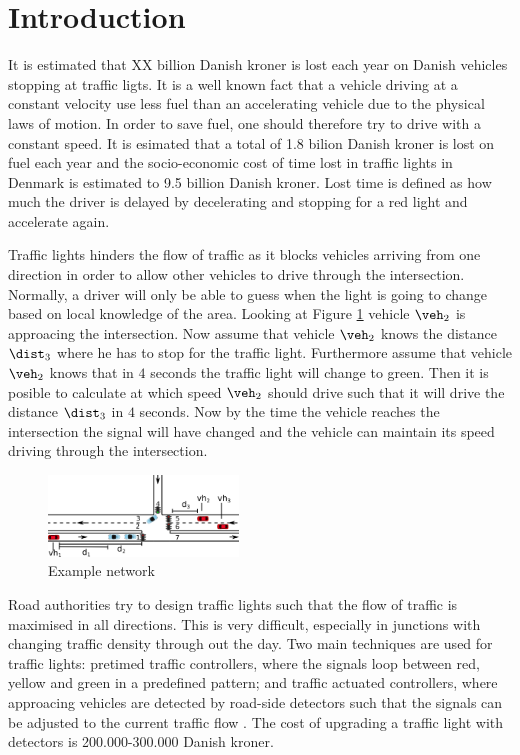 \section{Introduction}
It is estimated that XX billion Danish kroner is lost each year on Danish vehicles stopping at traffic ligts.\cite{Vejdir} %
It is a well known fact that a vehicle driving at a constant velocity use less fuel than an accelerating vehicle due to the physical laws of motion.
In order to save fuel, one should therefore try to drive with a constant speed.
It is esimated that a total of 1.8 bilion Danish kroner is lost on fuel each year and the socio-economic cost of time lost in traffic lights in Denmark is estimated to 9.5 billion Danish kroner. 
Lost time is defined as how much the driver is delayed by decelerating and stopping for a red light and accelerate again.

Traffic lights hinders the flow of traffic as it blocks vehicles arriving from one direction in order to allow other vehicles to drive through the intersection.
Normally, a driver will only be able to guess when the light is going to change based on local knowledge of the area. 
Looking at Figure \ref{fig:Introduction:network} vehicle $\veh_2$ is approacing the intersection.
Now assume that vehicle $\veh_2$ knows the distance $\dist_3$ where he has to stop for the traffic light. 
Furthermore assume that vehicle $\veh_2$ knows that in $4$ seconds the traffic light will change to green. 
Then it is posible to calculate at which speed $\veh_2$ should drive such that it will drive the distance $\dist_3$ in $4$ seconds. 
Now by the time the vehicle reaches the intersection the signal will have changed and the vehicle can maintain its speed driving through the intersection.
\begin{figure}[htb]
\centering
\includegraphics[width=0.45\textwidth]{../images/introNetwork.png}
\caption{Example network}
\label{fig:Introduction:network}
\end{figure}

Road authorities try to design traffic lights such that the flow of traffic is maximised in all directions.
This is very difficult, especially in junctions with changing traffic density through out the day.
Two main techniques are used for traffic lights: pretimed traffic controllers, where the signals loop between red, yellow and green in a predefined pattern; and traffic actuated controllers, where approacing vehicles are detected by road-side detectors such that the signals can be adjusted to the current traffic flow \cite{Vejdir}.
The cost of upgrading a traffic light with detectors is 200.000-300.000 Danish kroner\cite{Vejdir}.


